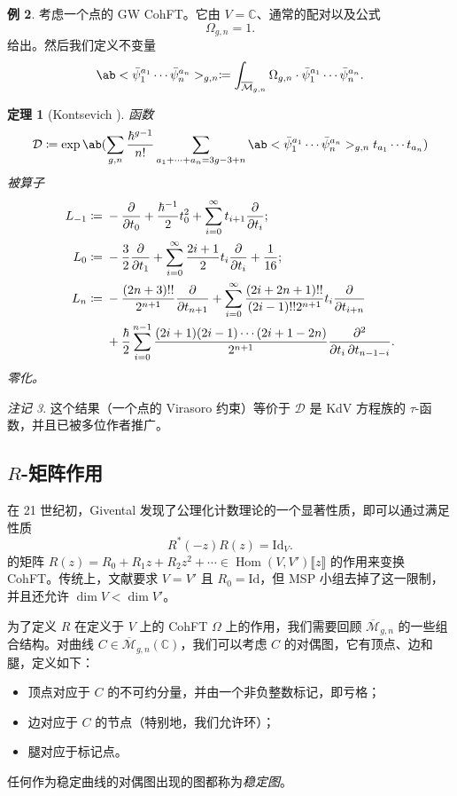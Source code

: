 \documentclass{amsart}
\newtheorem{thm}{定理}[section]
\theoremstyle{definition}
\newtheorem{exm}[thm]{例}
\theoremstyle{remark}
\newtheorem{rmk}[thm]{注记}
\theoremstyle{plain}
\theoremstyle{definition}
\theoremstyle{remark}
\newcommand{\C}{\mathbb{C}}
\newcommand{\Mbar}{\overline{\mathcal{M}}}
\newcommand{\mc}[1]{\mathcal{#1}}
\newcommand{\mr}[1]{\mathrm{#1}}
\newcommand{\1}{\mathbf{1}}
\newcommand{\2}{\mathbf{2}}
\newcommand{\3}{\mathbf{3}}
\newcommand{\ps}[1]{\llbracket #1 \rrbracket}
\DeclareMathOperator{\Hom}{Hom}
\begin{document}
\begin{exm}
    考虑一个点的 GW CohFT。它由 $V = \C$、通常的配对以及公式
    \[ \Omega_{g,n} = 1. \]
    给出。然后我们定义不变量
    \[ \ab<\bar{\psi}_1^{a_1} \cdots \bar{\psi}_n^{a_n}>_{g,n} \coloneqq \int_{\Mbar_{g,n}} \Omega_{g,n} \cdot \bar{\psi}_1^{a_1} \cdots \bar{\psi}_n^{a_n}. \]
    \begin{thm}[Kontsevich {\cite{Kontsevich1992}}]
        函数
        \[ \mc{D} \coloneqq \exp \ab(\sum_{g,n} \frac{\hbar^{g-1}}{n!}\sum_{a_1 + \cdots + a_n = 3g-3+n} \ab<\bar{\psi}_1^{a_1} \cdots \bar{\psi}_n^{a_n}>_{g,n} t_{a_1}\cdots t_{a_n}) \]
        被算子
        \begin{align*}
            L_{-1} \coloneqq{}& -\pdv{}{t_0} + \frac{\hbar^{-1}}{2} t_0^2 + \sum_{i=0}^{\infty} t_{i+1} \pdv{}{t_i};\\
            L_0 \coloneqq{}& -\frac{3}{2} \pdv{}{t_1} + \sum_{i=0}^{\infty} \frac{2i+1}{2} t_i \pdv{}{t_i} + \frac{1}{16};\\
            L_n \coloneqq{}& -\frac{(2n+3)!!}{2^{n+1}} \pdv{}{t_{n+1}} + \sum_{i=0}^{\infty} \frac{(2i+2n+1)!!}{(2i-1)!! 2^{n+1}} t_i \pdv{}{t_{i+n}} \\
            &+ \frac{\hbar}{2} \sum_{i=0}^{n-1} \frac{(2i+1) (2i-1) \cdots (2i+1-2n)}{2^{n+1}} \pdv{}{t_i,t_{n-1-i}}.
        \end{align*}
        零化。
    \end{thm}
\end{exm}

\begin{rmk}
    这个结果（一个点的 Virasoro 约束）等价于 $\mc{D}$ 是 KdV 方程族的 $\tau$-函数，并且已被多位作者推广。
\end{rmk}



\subsection{$R$-矩阵作用}%
\label{sub:R-matrix action}

在 21 世纪初，Givental 发现了公理化计数理论的一个显著性质，即可以通过满足性质
\[ R^*(-z) R(z) = \mr{Id}_V. \]
的矩阵 $R(z) = R_0 + R_1 z + R_2 z^2 + \cdots \in \Hom(V, V')\ps{z}$ 的作用来变换 CohFT。传统上，文献要求 $V = V'$ 且 $R_0 = \mr{Id}$，但 MSP 小组去掉了这一限制，并且还允许 $\dim V < \dim V'$。

为了定义 $R$ 在定义于 $V$ 上的 CohFT $\Omega$ 上的作用，我们需要回顾 $\Mbar_{g,n}$ 的一些组合结构。对曲线 $C\in \Mbar_{g,n}(\C)$，我们可以考虑 $C$ 的对偶图，它有顶点、边和腿，定义如下：
\begin{itemize}
    \item 顶点对应于 $C$ 的不可约分量，并由一个非负整数标记，即亏格；
    \item 边对应于 $C$ 的节点（特别地，我们允许环）；
    \item 腿对应于标记点。
\end{itemize}
任何作为稳定曲线的对偶图出现的图都称为\textit{稳定图}。
\end{document}
